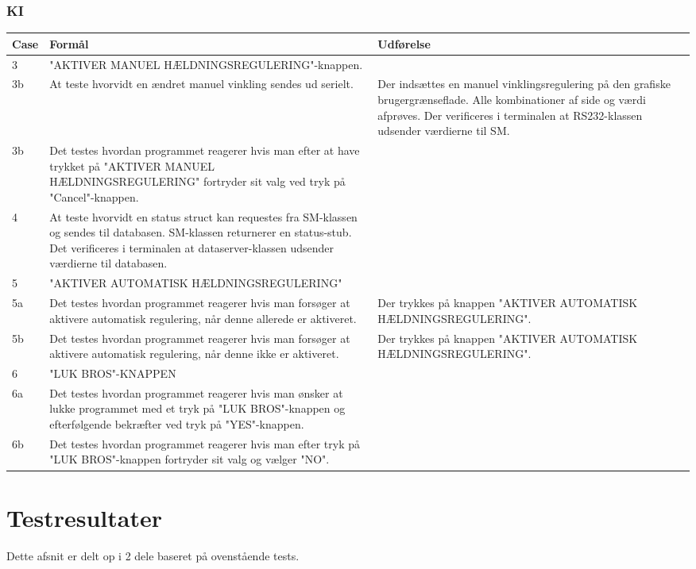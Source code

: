 \subsubsection{KI}
\begin{table}[H]
\centering
\begin{tabular}{| p{1.2cm}  | p{4.5cm} | p{8cm} |}
\hline
Case &Formål &Udførelse\\\hline
3 &"AKTIVER MANUEL HÆLDNINGSREGULERING"-knappen.\\\hline
3b &At teste hvorvidt en ændret manuel vinkling sendes ud serielt. &Der indsættes en manuel vinklingsregulering på den grafiske brugergrænseflade. Alle kombinationer af side og værdi afprøves. Der verificeres i terminalen at RS232-klassen udsender værdierne til SM.\\\hline
3b &Det testes hvordan programmet reagerer hvis man efter at have trykket på "AKTIVER MANUEL HÆLDNINGSREGULERING" fortryder sit valg ved tryk på "Cancel"-knappen.\\\hline
4 &At teste hvorvidt en status struct kan requestes fra SM-klassen og sendes til databasen. SM-klassen returnerer en status-stub. Det verificeres i terminalen at dataserver-klassen udsender værdierne til databasen.\\\hline
5 &"AKTIVER AUTOMATISK HÆLDNINGSREGULERING"\\\hline
5a &Det testes hvordan programmet reagerer hvis man forsøger at aktivere automatisk regulering, når denne allerede er aktiveret. &Der trykkes på knappen "AKTIVER AUTOMATISK HÆLDNINGSREGULERING".\\\hline
5b &Det testes hvordan programmet reagerer hvis man forsøger at aktivere automatisk regulering, når denne ikke er aktiveret. &Der trykkes på knappen "AKTIVER AUTOMATISK HÆLDNINGSREGULERING".\\\hline
6 &"LUK BROS"-KNAPPEN\\\hline
6a &Det testes hvordan programmet reagerer hvis man ønsker at lukke programmet med et tryk på "LUK BROS"-knappen og efterfølgende bekræfter ved tryk på "YES"-knappen.\\\hline
6b &Det testes hvordan programmet reagerer hvis man efter tryk på "LUK BROS"-knappen fortryder sit valg og vælger "NO".\\\hline
\end{tabular}
\end{table}
\section{Testresultater}
Dette afsnit er delt op i  2 dele baseret på ovenstående tests.\\
